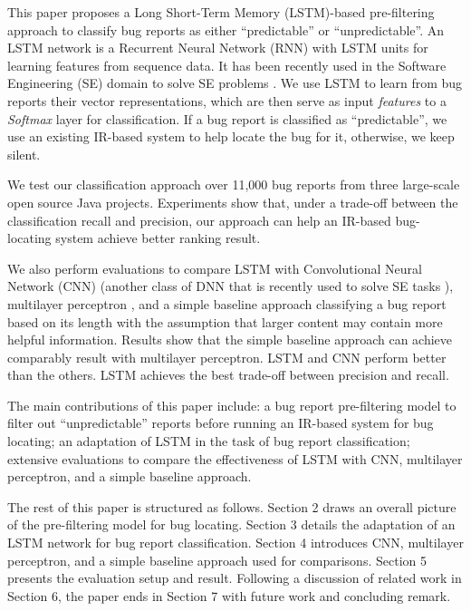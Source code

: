 This paper proposes a Long Short-Term Memory (LSTM)-based pre-filtering approach to classify bug reports as either ``predictable'' or ``unpredictable''. An LSTM network is a Recurrent Neural Network (RNN) with LSTM units \cite{Hochreiter:1997:LSM:1246443.1246450} for learning features from sequence data. It has been recently used in the Software Engineering (SE) domain to solve SE problems \cite{8255666, Huo:2017:EUF:3172077.3172153}. We use LSTM to learn from bug reports their vector representations, which are then serve as input \textit{features} to a \textit{Softmax} layer for classification. If a bug report is classified as ``predictable'', we use an existing IR-based system to help locate the bug for it, otherwise, we keep silent.

We test our classification approach over 11,000 bug reports from three large-scale open source Java projects. Experiments show that, under a trade-off between the classification recall and precision, our approach can help an IR-based bug-locating system achieve better ranking result.

We also perform evaluations to compare LSTM with Convolutional Neural Network (CNN) \cite{726791} (another class of DNN that is recently used to solve SE tasks \cite{Le:2015:IRS:2786805.2786880, Xu:2016:PSL:2970276.2970357, Mou:2016:CNN:3015812.3016002}), multilayer perceptron \cite{Hornik:1989:MFN:70405.70408}, and a simple baseline approach classifying a bug report based on its length with the assumption that larger content may contain more helpful information. Results show that the simple baseline approach can achieve comparably result with multilayer perceptron. LSTM and CNN perform better than the others. LSTM achieves the best trade-off between precision and recall. 

The main contributions of this paper include: a bug report pre-filtering model to filter out ``unpredictable'' reports before running an IR-based system for bug locating; an adaptation of LSTM in the task of bug report classification; extensive evaluations to compare the effectiveness of LSTM with CNN, multilayer perceptron, and a simple baseline approach.

The rest of this paper is structured as follows. Section 2 draws an overall picture of the pre-filtering model for bug locating. Section 3 details the adaptation of an LSTM network for bug report classification. Section 4 introduces CNN, multilayer perceptron, and a simple baseline approach used for comparisons. Section 5 presents the evaluation setup and result. Following a discussion of related work in Section 6, the paper ends in Section 7 with future work and concluding remark.

